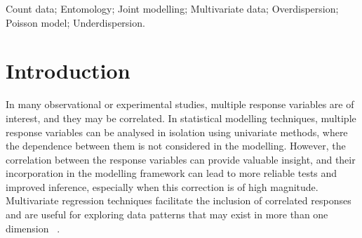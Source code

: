 \documentclass[useAMS,referee]{biom}
\begin{document}
%

\begin{keywords}
Count data; Entomology; Joint modelling; Multivariate data; Overdispersion; Poisson model; Underdispersion.
\end{keywords}


\maketitle



%

\section{Introduction}
\label{s:intro}

In many observational or experimental studies, multiple response variables are of interest, and they may be correlated. In statistical modelling techniques, multiple response variables can be analysed in isolation using univariate methods, where the dependence between them is not considered in the modelling. However, the correlation between the response variables can provide valuable insight, and their incorporation in the modelling framework can lead to more reliable tests and improved inference, especially when this correction is of high magnitude. Multivariate regression techniques facilitate the inclusion of correlated responses and are useful for exploring data patterns that may exist in more than one dimension ~\citep{raykov2008introduction,everitt2011introduction}. 
\end{document}
